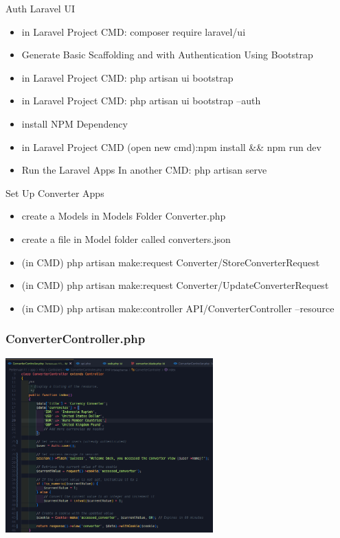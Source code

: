 \documentclass[aspectratio=169, table]{beamer}
\begin{document}
\begin{frame}[fragile]{Auth Laravel UI}
    \begin{itemize}
        \item in Laravel Project CMD: composer require laravel/ui
        \item Generate Basic Scaffolding and with Authentication Using Bootstrap
        \item in Laravel Project CMD: php artisan ui bootstrap
        \item in Laravel Project CMD: php artisan ui bootstrap --auth
        \item install NPM Dependency
        \item in Laravel Project CMD (open new cmd):npm install \&\& npm run dev
        \item Run the Laravel Apps In another CMD: php artisan serve
    \end{itemize}
\end{frame}

\begin{frame}[fragile]{Set Up Converter Apps}
    \begin{itemize}
        \item create a Models in Models Folder Converter.php
        \item create a file in Model folder called converters.json
        \item (in CMD) php artisan make:request Converter/StoreConverterRequest
        \item (in CMD) php artisan make:request Converter/UpdateConverterRequest
        \item (in CMD) php artisan make:controller API/ConverterController --resource
    \end{itemize}
\end{frame}

\begin{frame}[fragile]
 \frametitle{ConverterController.php}
 \vskip1cm
 \begin{center}
  \includegraphics[width=0.6\textwidth]{classFiles/pertemuan-11-controller-part-1.png}
 \end{center}
\end{frame}
\end{document}

